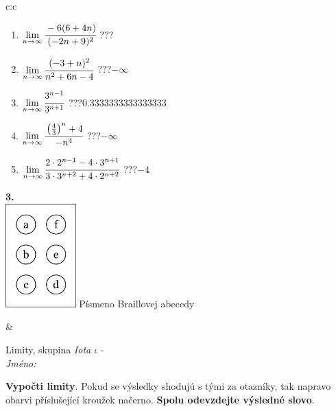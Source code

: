 \documentclass[10pt]{report}
\begin{document}
\begin{tabular}{c:c}
\begin{minipage}[c][104.5mm][t]{0.5\linewidth}
\begin{center}
\begin{minipage}{0.79\linewidth}
\begin{center}
\begin{varwidth}{\linewidth}
\begin{enumerate}
\item $\lim\limits_{n\to\infty}\cfrac{-6(6+4n)}{(-2n+9)^2}$\quad \dotfill\; ???\;\dotfill {}
\item $\lim\limits_{n\to\infty}\cfrac{(-3+n)^2}{n^2+6n-4}$\quad \dotfill\; ???\;\dotfill \quad $-\infty$
\item $\lim\limits_{n\to\infty}\cfrac{3^{n-1}}{3^{n+1}}$\quad \dotfill\; ???\;\dotfill \quad $0.3333333333333333$
\item $\lim\limits_{n\to\infty}\cfrac{\left(\frac{4}{3}\right)^n +4}{-n^{4}}$\quad \dotfill\; ???\;\dotfill \quad $-\infty$
\item $\lim\limits_{n\to\infty}\cfrac{2\cdot 2^{n-1}-4\cdot 3^{n+1}}{3\cdot 3^{n+2}+4\cdot 2^{n+2}}$\quad \dotfill\; ???\;\dotfill \quad $-4$
\end{enumerate}
\end{varwidth}
\end{center}
\end{minipage}
\begin{minipage}{0.20\linewidth}
\begin{center}
{\Huge\bfseries 3.} \\[2mm]
\includegraphics[height=40mm]{../images/braille.png}
{\small Písmeno Braillovej abecedy}
\end{center}
\end{minipage}
\end{center}
\end{minipage}
&
\begin{minipage}[c][104.5mm][t]{0.5\linewidth}
\begin{center}
\vspace{7mm}
{\huge Limity, skupina \textit{Iota $\iota$} -}\\[5mm]
\textit{Jméno:}\phantom{xxxxxxxxxxxxxxxxxxxxxxxxxxxxxxxxxxxxxxxxxxxxxxxxxxxxxxxxxxxxxxxxx}\\[5mm]
\begin{minipage}{0.95\linewidth}
\begin{center}
\textbf{Vypočti limity}. Pokud se výsledky shodujú s tými za otazníky, tak napravo\\obarvi příslušející kroužek načerno. \textbf{Spolu odevzdejte výsledné slovo}.

\end{center}
\end{minipage}
\end{center}
\end{minipage}
\end{tabular}
\end{document}
